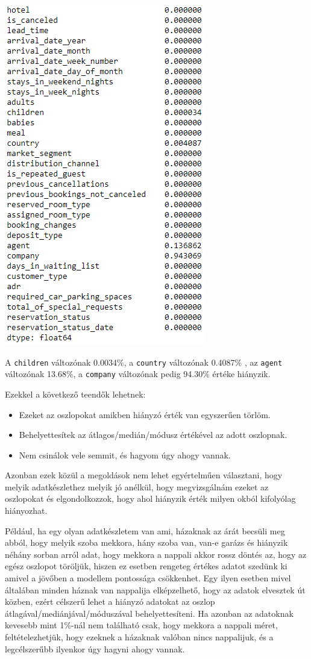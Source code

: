 \includegraphics[scale=0.7]{images/4.fejezet/1.adatelokeszites1.PNG}

A \texttt{children} változónak 0.0034\%, a \texttt{country} változónak 0.4087\% , az \texttt{agent} változónak 13.68\%, a \texttt{company} változónak pedig 94.30\% értéke hiányzik.

Ezekkel a következő teendők lehetnek:
\begin{itemize}
    \item Ezeket az oszlopokat amikben hiányzó érték van egyszerűen törlöm.
    \item Behelyettesítek az átlagos/medián/módusz értékével az adott oszlopnak.
    \item Nem csinálok vele semmit, és hagyom úgy ahogy vannak.
\end{itemize}

Azonban ezek közül a megoldások nem lehet egyértelműen választani, hogy melyik adatkészlethez melyik jó anélkül, hogy megvizsgálnám ezeket az oszlopokat és elgondolkozzok, hogy ahol hiányzik érték milyen okból kifolyólag hiányozhat.

Például, ha egy olyan adatkészletem van ami, házaknak az árát becsüli meg abból, hogy melyik szoba mekkora, hány szoba van, van-e garázs és hiányzik néhány sorban arról adat, hogy mekkora a nappali akkor rossz döntés az, hogy az egész oszlopot töröljük, hiszen ez esetben rengeteg értékes adatot szedünk ki amivel a jövőben a modellem pontossága csökkenhet. Egy ilyen esetben mivel általában minden háznak van nappalija elképzelhető, hogy az adatok elvesztek út közben, ezért célszerű lehet a hiányzó adatokat az oszlop átlagával/mediánjával/móduszával behelyettesíteni. Ha azonban az adatoknak kevesebb mint 1\%-nál nem található csak, hogy mekkora a nappali méret, feltételezhetjük, hogy ezeknek a házaknak valóban nincs nappalijuk, és a legcélszerűbb ilyenkor úgy hagyni ahogy vannak.

